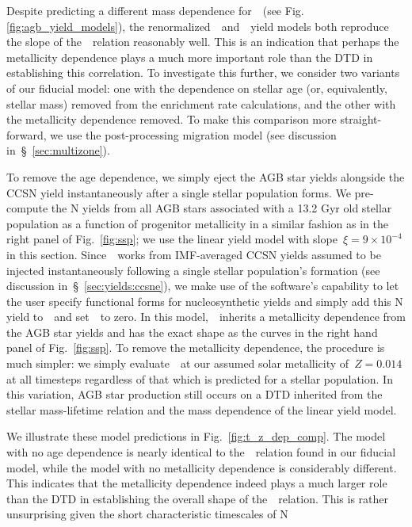 \documentclass[ms.tex]{subfiles}
\begin{document}
Despite predicting a different mass dependence for~~(see Fig.
\ref{fig:agb_yield_models}), the renormalized~\cristallo~and~\ventura~yield
models both reproduce the slope of the~\ohno~relation reasonably well.
This is an indication that perhaps the metallicity dependence plays a much
more important role than the DTD in establishing this correlation.
To investigate this further, we consider two variants of our fiducial model:
one with the dependence on stellar age (or, equivalently, stellar mass)
removed from the enrichment rate calculations, and the other with the
metallicity dependence removed.
To make this comparison more straight-forward, we use the post-processing
migration model (see discussion in~\S~\ref{sec:multizone}).
\par
To remove the age dependence, we simply eject the AGB star yields alongside
the CCSN yield instantaneously after a single stellar population forms.
We pre-compute the N yields from all AGB stars associated with a 13.2 Gyr old
stellar population as a function of progenitor metallicity in a similar fashion
as in the right panel of Fig.~\ref{fig:ssp}; we use the linear yield model with
slope~$\xi = 9\times10^{-4}$ in this section.
Since~\vice~works from IMF-averaged CCSN yields assumed to be injected
instantaneously following a single stellar population's formation (see
discussion in~\S~\ref{sec:yields:ccsne}), we make use of the software's
capability to let the user specify functional forms for nucleosynthetic yields
and simply add this N yield to~~and set~~to zero.
In this model,~~inherits a metallicity dependence from the AGB star
yields and has the exact shape as the curves in the right hand panel of
Fig.~\ref{fig:ssp}.
To remove the metallicity dependence, the procedure is much simpler: we simply
evaluate~~at our assumed solar metallicity of~$Z = 0.014$ at all
timesteps regardless of that which is predicted for a stellar population.
In this variation, AGB star production still occurs on a DTD inherited from
the stellar mass-lifetime relation and the mass dependence of the linear yield
model.
\par
We illustrate these model predictions in Fig.~\ref{fig:t_z_dep_comp}.
The model with no age dependence is nearly identical to the~\ohno~relation
found in our fiducial model, while the model with no metallicity dependence
is considerably different.
This indicates that the metallicity dependence indeed plays a much larger role
than the DTD in establishing the overall shape of the~\ohno~relation.
This is rather unsurprising given the short characteristic timescales of N
\end{document}
